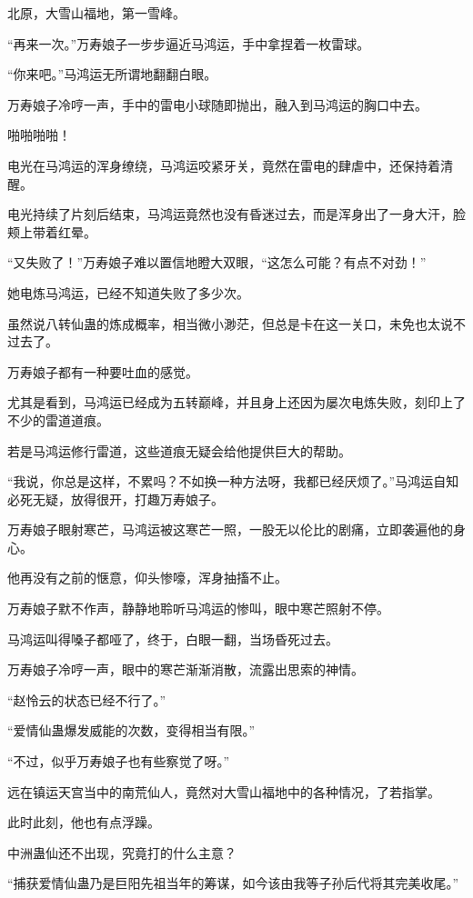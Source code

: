 
\begin{this_body}

北原，大雪山福地，第一雪峰。

“再来一次。”万寿娘子一步步逼近马鸿运，手中拿捏着一枚雷球。

“你来吧。”马鸿运无所谓地翻翻白眼。

万寿娘子冷哼一声，手中的雷电小球随即抛出，融入到马鸿运的胸口中去。

啪啪啪啪！

电光在马鸿运的浑身缭绕，马鸿运咬紧牙关，竟然在雷电的肆虐中，还保持着清醒。

电光持续了片刻后结束，马鸿运竟然也没有昏迷过去，而是浑身出了一身大汗，脸颊上带着红晕。

“又失败了！”万寿娘子难以置信地瞪大双眼，“这怎么可能？有点不对劲！”

她电炼马鸿运，已经不知道失败了多少次。

虽然说八转仙蛊的炼成概率，相当微小渺茫，但总是卡在这一关口，未免也太说不过去了。

万寿娘子都有一种要吐血的感觉。

尤其是看到，马鸿运已经成为五转巅峰，并且身上还因为屡次电炼失败，刻印上了不少的雷道道痕。

若是马鸿运修行雷道，这些道痕无疑会给他提供巨大的帮助。

“我说，你总是这样，不累吗？不如换一种方法呀，我都已经厌烦了。”马鸿运自知必死无疑，放得很开，打趣万寿娘子。

万寿娘子眼射寒芒，马鸿运被这寒芒一照，一股无以伦比的剧痛，立即袭遍他的身心。

他再没有之前的惬意，仰头惨嚎，浑身抽搐不止。

万寿娘子默不作声，静静地聆听马鸿运的惨叫，眼中寒芒照射不停。

马鸿运叫得嗓子都哑了，终于，白眼一翻，当场昏死过去。

万寿娘子冷哼一声，眼中的寒芒渐渐消散，流露出思索的神情。

“赵怜云的状态已经不行了。”

“爱情仙蛊爆发威能的次数，变得相当有限。”

“不过，似乎万寿娘子也有些察觉了呀。”

远在镇运天宫当中的南荒仙人，竟然对大雪山福地中的各种情况，了若指掌。

此时此刻，他也有点浮躁。

中洲蛊仙还不出现，究竟打的什么主意？

“捕获爱情仙蛊乃是巨阳先祖当年的筹谋，如今该由我等子孙后代将其完美收尾。”


\end{this_body}

